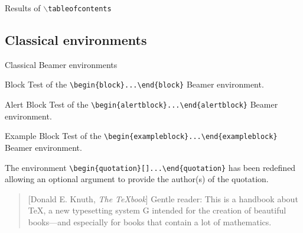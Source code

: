 \documentclass[10pt,aspectratio=169,english]{beamer}
\begin{document}
\begin{frame}[fragile]{Results of \texttt{$\backslash$tableofcontents}}
  \tableofcontents
\end{frame}

\subsection{Classical environments}

\begin{frame}{Classical Beamer environments}
  \begin{block}{Block}
    Test of the \lstinline+\begin{block}...\end{block}+ Beamer environment.
  \end{block}
  \begin{alertblock}{Alert Block}
    Test of the \lstinline+\begin{alertblock}...\end{alertblock}+ Beamer environment.
  \end{alertblock}
  \begin{exampleblock}{Example Block}
    Test of the \lstinline+\begin{exampleblock}...\end{exampleblock}+ Beamer environment.
  \end{exampleblock}

  \framebreak


  \begin{abstract}
    This is the result of the \lstinline+\begin{abstract}...\end{abstract}+
    environment.
  \end{abstract}


  The environment \lstinline+\begin{quotation}[+\lstinline+]...\end{quotation}+ has been
  redefined allowing an optional argument to provide the author(s) of the
  quotation.

  \begin{quotation}[Donald E. Knuth, \emph{The \TeX book}]
Gentle reader: This is a handbook about \TeX, a new typesetting system G
intended for the creation of beautiful books—and especially for books that
contain a lot of mathematics.
\end{quotation}


\end{frame}
\end{document}
